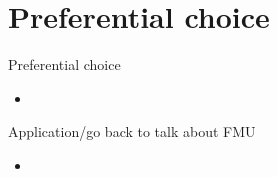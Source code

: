 \documentclass[%
slidestop,%
compress,%
mathserif,%
table,%
usenames,%
aspectratio=169,
dvipsnames,%
]{beamer}%
\begin{document}
\section{Preferential choice}
\begin{frame}{Preferential choice}
    \begin{itemize}
        \item 
    \end{itemize}
\end{frame}

\begin{frame}{Application/go back to talk about FMU}
    \begin{itemize}
        \item 
    \end{itemize}
\end{frame}
\end{document}
